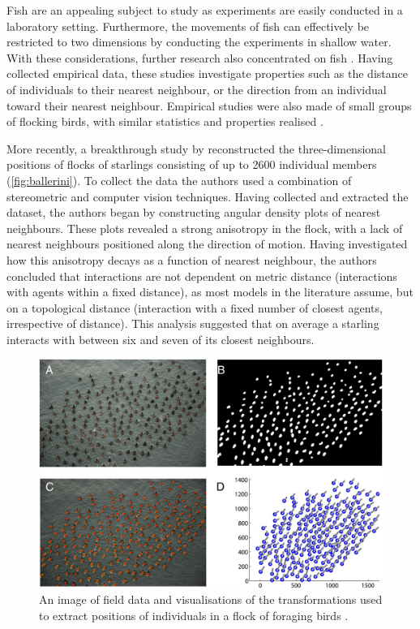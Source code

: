 Fish are an appealing subject to study as experiments are easily conducted in a
laboratory setting. Furthermore, the movements of fish can effectively be
restricted to two dimensions by conducting the experiments in shallow water.
With these considerations, further research also concentrated on fish
\parencite{partridge80,van_long85}. Having collected empirical data, these
studies investigate properties such as the distance of individuals to their
nearest neighbour, or the direction from an individual toward their nearest
neighbour. Empirical studies were also made of small groups of flocking birds,
with similar statistics and properties realised \parencite{major78,budgey98}.

More recently, a breakthrough study by \textcite{ballerini08} reconstructed the
three-dimensional positions of flocks of starlings consisting of up to 2600
individual members (\cref{fig:ballerini}). To collect the data the authors
used a combination of stereometric and computer vision techniques. Having
collected and extracted the dataset, the authors began by constructing angular
density plots of nearest neighbours. These plots revealed a strong anisotropy
in the flock, with a lack of nearest neighbours positioned along the direction
of motion. Having investigated how this anisotropy decays as a function of
nearest neighbour, the authors concluded that interactions are not dependent on
metric distance (interactions with agents within a fixed distance), as most
models in the literature assume, but on a topological distance (interaction
with a fixed number of closest agents, irrespective of distance). This analysis
suggested that on average a starling interacts with between six and seven of
its closest neighbours.

\begin{figure}[tb]
  \includegraphics[width=\textwidth]{lukeman_data.jpg}
  \caption{An image of field data and visualisations of the transformations
    used to extract positions of individuals in a flock of foraging birds
    \parencite{lukeman10}.}
  \label{fig:lukeman_extraction}
\end{figure}

